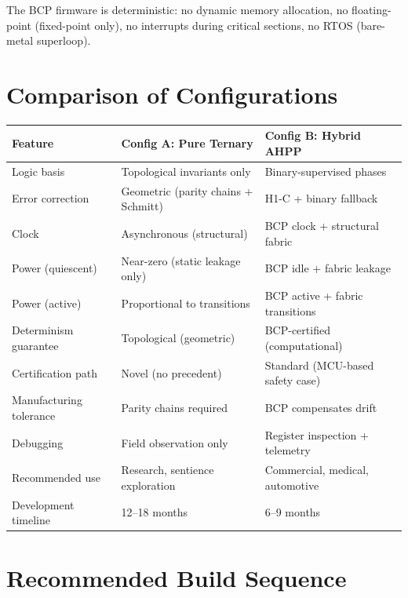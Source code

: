 \documentclass[11pt, a4paper]{article}
\begin{document}
The BCP firmware is deterministic: no dynamic memory allocation, no
floating-point (fixed-point only), no interrupts during critical sections,
no RTOS (bare-metal superloop).

\section{Comparison of Configurations}

\begin{center}
\begin{tabular}{@{}p{3.5cm}p{5.5cm}p{5.5cm}@{}}
\toprule
\textbf{Feature} & \textbf{Config A: Pure Ternary} & \textbf{Config B: Hybrid AHPP} \\
\midrule
Logic basis & Topological invariants only & Binary-supervised phases \\
Error correction & Geometric (parity chains + Schmitt) & H1-C + binary fallback \\
Clock & Asynchronous (structural) & BCP clock + structural fabric \\
Power (quiescent) & Near-zero (static leakage only) & BCP idle + fabric leakage \\
Power (active) & Proportional to transitions & BCP active + fabric transitions \\
Determinism guarantee & Topological (geometric) & BCP-certified (computational) \\
Certification path & Novel (no precedent) & Standard (MCU-based safety case) \\
Manufacturing tolerance & Parity chains required & BCP compensates drift \\
Debugging & Field observation only & Register inspection + telemetry \\
Recommended use & Research, sentience exploration & Commercial, medical, automotive \\
Development timeline & 12--18 months & 6--9 months \\
\bottomrule
\end{tabular}
\end{center}

\section{Recommended Build Sequence}
\end{document}
